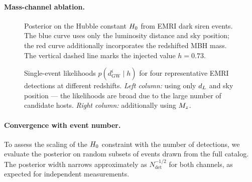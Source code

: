 \paragraph{Mass-channel ablation.}

\begin{figure}[t]
  \centering
  \caption{Posterior on the Hubble constant $H_0$ from
   EMRI dark siren events. The blue curve uses only
  the luminosity distance and sky position; the red curve additionally
  incorporates the redshifted MBH mass. The vertical
  dashed line marks the injected value $h = 0.73$.}
  \label{fig:posterior_comparison}
\end{figure}


\begin{figure}[t]
  \centering
  \caption{Single-event likelihoods $p(d_\mathrm{GW}^i \mid h)$ for
  four representative EMRI detections at different redshifts.
  \emph{Left column:} using only $d_L$ and sky position --- the
  likelihoods are broad due to the large number of candidate hosts.
  \emph{Right column:} additionally using $M_z$.}
  \label{fig:single_event}
\end{figure}

\paragraph{Convergence with event number.}
To assess the scaling of the $H_0$ constraint with the number of
detections, we evaluate the posterior on random subsets of
 events drawn from the full catalog. The
posterior width narrows approximately as $N_\mathrm{det}^{-1/2}$
for both channels, as expected for independent measurements.

